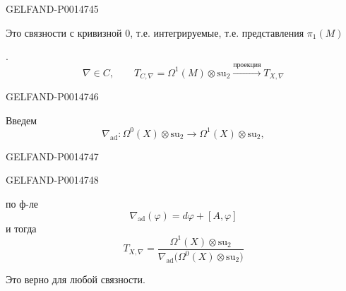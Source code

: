\begin{GelfandAdjacentEvidence}{GELFAND-P001474}{5}


Это связности с кривизной \(0\), т.е. интегрируемые, т.е. представления \(\pi_1(M)\)

.
\begin{equation*}
\nabla\in C,\qquad
T_{C,\nabla}=\Omega^1(M)\otimes\mathrm{su}_2
\xrightarrow{\text{проекция}}T_{X,\nabla}
\tag{10}
\end{equation*}
\end{GelfandAdjacentEvidence}
\begin{GelfandAdjacentEvidence}{GELFAND-P001474}{6}


Введем
\begin{equation*}
\nabla_{\mathrm{ad}}\colon\Omega^0(X)\otimes\mathrm{su}_2
\longrightarrow\Omega^1(X)\otimes\mathrm{su}_2,
\tag{11?}
\end{equation*}
\end{GelfandAdjacentEvidence}
\begin{GelfandAdjacentEvidence}{GELFAND-P001474}{7}

\end{GelfandAdjacentEvidence}
\begin{GelfandAdjacentEvidence}{GELFAND-P001474}{8}


по ф-ле
\begin{equation*}
\nabla_{\mathrm{ad}}(\varphi)=d\varphi+[A,\varphi]
\tag{12}
\end{equation*}
и тогда
\begin{equation*}
T_{X,\nabla}=\frac{\Omega^1(X)\otimes\mathrm{su}_2}
{\nabla_{\mathrm{ad}}\bigl(\Omega^0(X)\otimes\mathrm{su}_2\bigr)}
\tag{13}
\end{equation*}
\end{GelfandAdjacentEvidence}


Это верно для любой связности.


